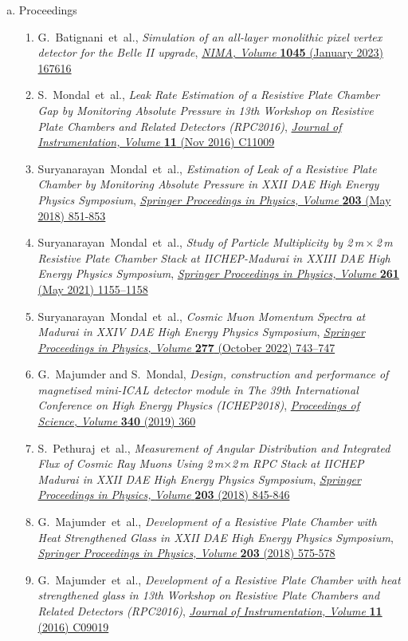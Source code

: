 \documentclass[12pt]{article}
\begin{document}
\begin{enumerate}[b.]
\item Proceedings
  \begin{enumerate}[1.]
  \item G.~Batignani~et~al., \emph{Simulation of an all-layer monolithic pixel vertex detector for the Belle II upgrade}, \href{https://doi.org/10.1016/j.nima.2022.167616}{\emph{NIMA, Volume } \textbf{1045} (January 2023) 167616}
  \item S.~Mondal~et~al., \emph{Leak Rate Estimation of a Resistive Plate Chamber Gap by Monitoring Absolute Pressure in 13th Workshop on Resistive Plate Chambers and Related Detectors (RPC2016)}, \href{https://doi.org/10.1088/1748-0221/11/11/C11009}{\emph{Journal of Instrumentation, Volume } \textbf{11} (Nov 2016) C11009}
  \item Suryanarayan~Mondal~et~al., \emph{Estimation of Leak of a Resistive Plate Chamber by Monitoring Absolute Pressure in XXII DAE High Energy Physics Symposium}, \href{https://doi.org/10.1007/978-3-319-73171-1_207}{\emph{Springer Proceedings in Physics, Volume } \textbf{203} (May 2018) 851-853}
  \item Suryanarayan~Mondal~et~al., \emph{Study of Particle Multiplicity by 2\,m\,$\times$\,2\,m Resistive Plate Chamber Stack at IICHEP-Madurai in XXIII DAE High Energy Physics Symposium}, \href{https://doi.org/10.1007/978-981-33-4408-2_172}{\emph{Springer Proceedings in Physics, Volume } \textbf{261} (May 2021) 1155--1158}
  \item Suryanarayan~Mondal~et~al., \emph{Cosmic Muon Momentum Spectra at Madurai in XXIV DAE High Energy Physics Symposium}, \href{https://doi.org/10.1007/978-981-19-2354-8_134}{\emph{Springer Proceedings in Physics, Volume } \textbf{277} (October 2022) 743--747}
  \item G.~Majumder and S.~Mondal, \emph{Design, construction and performance of magnetised mini-ICAL detector module in The 39th International Conference on High Energy Physics (ICHEP2018)}, \href{https://doi.org/10.22323/1.340.0360}{\emph{Proceedings of Science,} \textit{Volume} \textbf{340} (2019) 360}
  \item S.~Pethuraj~et~al., \emph{Measurement of Angular Distribution and Integrated Flux of Cosmic Ray Muons Using 2\,m$\times$2\,m RPC Stack at IICHEP Madurai in XXII DAE High Energy Physics Symposium}, \href{https://doi.org/10.1007/978-3-319-73171-1_205}{\emph{Springer Proceedings in Physics,} \emph{Volume} \textbf{203} (2018) 845-846}
  \item G.~Majumder~et~al., \emph{Development of a Resistive Plate Chamber with Heat Strengthened Glass in XXII DAE High Energy Physics Symposium}, \href{https://doi.org/10.1007/978-3-319-73171-1_135}{\emph{Springer Proceedings in Physics, Volume} \textbf{203} (2018) 575-578}
  \item  G.~Majumder~et~al., \emph{Development of a Resistive Plate Chamber with heat strengthened glass in 13th Workshop on Resistive Plate Chambers and Related Detectors (RPC2016)}, \href{https://doi.org/10.1088/1748-0221/11/09/C09019}{\emph{Journal of Instrumentation, Volume} \textbf{11} (2016) C09019}
  \end{enumerate}
\end{enumerate}
\newpage
\end{document}
